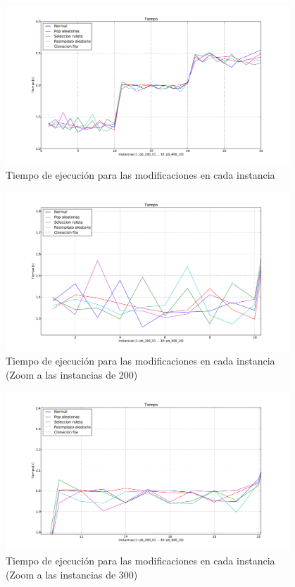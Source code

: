\begin{figure}[H]
\begin{center}
\includegraphics[width=0.95\textwidth]{img/t.pdf}
\end{center}
\caption{Tiempo de ejecución para las modificaciones en cada instancia}
\label{fig:t}
\end{figure}

\begin{figure}[H]
\begin{center}
\includegraphics[width=0.95\textwidth]{img/t-zoom200.pdf}
\end{center}
\caption{Tiempo de ejecución para las modificaciones en cada instancia (Zoom a las instancias de 200)}
\label{fig:t200}
\end{figure}

\begin{figure}[H]
\begin{center}
\includegraphics[width=0.95\textwidth]{img/t-zoom300.pdf}
\end{center}
\caption{Tiempo de ejecución para las modificaciones en cada instancia (Zoom a las instancias de 300)}
\label{fig:t300}
\end{figure}

